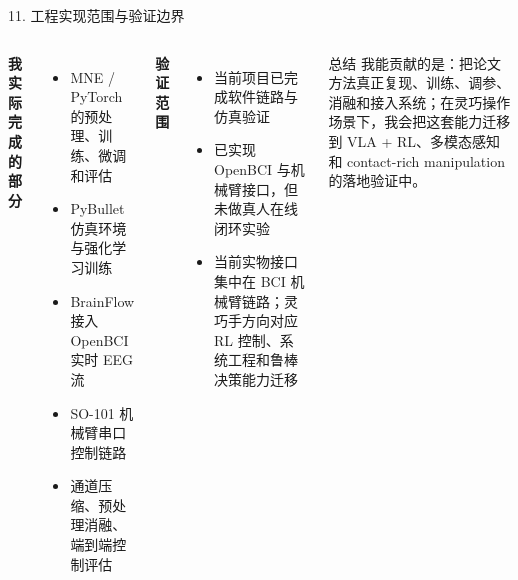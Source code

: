 \documentclass[UTF8,aspectratio=169,11pt]{ctexbeamer}
\begin{document}
\begin{frame}[shrink=7]{11. 工程实现范围与验证边界}

    \begin{columns}[T]
        \textbf{我实际完成的部分}
        \begin{itemize}
            \item MNE / PyTorch 的预处理、训练、微调和评估
            \item PyBullet 仿真环境与强化学习训练
            \item BrainFlow 接入 OpenBCI 实时 EEG 流
            \item SO-101 机械臂串口控制链路
            \item 通道压缩、预处理消融、端到端控制评估
        \end{itemize}

        \textbf{验证范围}
        \begin{itemize}
            \item 当前项目已完成软件链路与仿真验证
            \item 已实现 OpenBCI 与机械臂接口，但未做真人在线闭环实验
            \item 当前实物接口集中在 BCI 机械臂链路；灵巧手方向对应 RL 控制、系统工程和鲁棒决策能力迁移
        \end{itemize}

        \vspace{2mm}
        \begin{exampleblock}{总结}
            我能贡献的是：把论文方法真正复现、训练、调参、消融和接入系统；在灵巧操作场景下，我会把这套能力迁移到 VLA + RL、多模态感知和 contact-rich manipulation 的落地验证中。
        \end{exampleblock}
    \end{columns}
\end{frame}
\end{document}
